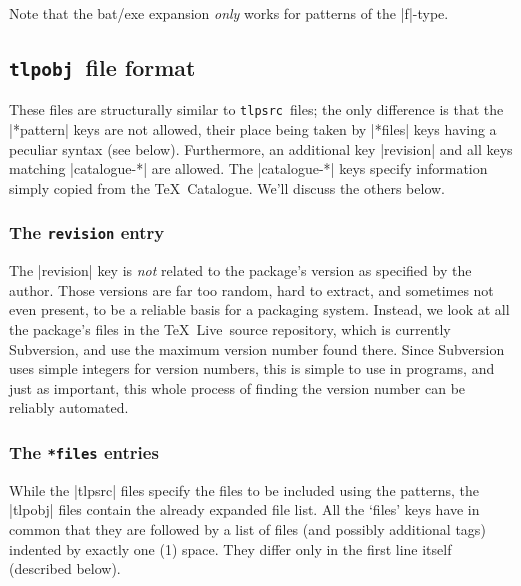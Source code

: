 \documentclass{arstexnica}
\newcommand{\tl}{\TeX~Live}
\newcommand{\tlpsrc}{\texttt{tlpsrc}}
\newcommand{\tlpobj}{\texttt{tlpobj}}
\begin{document}
\begin{article}
Note that the bat/exe expansion \emph{only} works for patterns of the
|f|-type. 

\subsection{\tlpobj\ file format}
\label{sec:tlpobj}

These files are structurally similar to \tlpsrc\ files; the
only difference is that the |*pattern| keys are not allowed, their
place being taken by |*files| keys having a peculiar syntax (see
below). Furthermore, an additional key |revision| and all keys
matching |catalogue-*| are allowed.  
The |catalogue-*| keys specify information simply copied from the \TeX\
Catalogue.  We'll discuss the others below.

\subsubsection{The \texttt{revision} entry}

The |revision| key is {\em not} related to the package's version as
specified by the author.  Those versions are far too random, hard to
extract, and sometimes not even present, to be a reliable basis for a
packaging system.  Instead, we look at all the package's files in the
\tl\ source repository, which is currently Subversion, and use the
maximum version number found there.  Since Subversion uses simple
integers for version numbers, this is simple to use in programs, and
just as important, this whole process of finding the version number can
be reliably automated.

\subsubsection{The \texttt{*files} entries}
\label{sec:keyfiles}

While the |tlpsrc| files specify the files to be included using the 
patterns, the |tlpobj| files contain the already expanded file list.
All the `files' keys have in common that they are followed by a list of
files (and possibly additional tags) indented by exactly one (1) space. They
differ only in the first line itself (described below).




\end{article}
\end{document}
